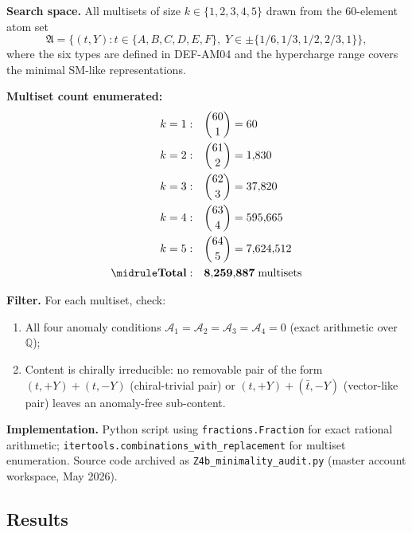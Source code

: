 \documentclass[12pt, a4paper]{article}
\begin{document}
\begin{formalbox}[title={Audit methodology (v17.5 master account)}]
\textbf{Search space.} All multisets of size $k \in \{1, 2, 3, 4, 5\}$
drawn from the 60-element atom set
\begin{equation*}
  \mathfrak{A} = \{(t, Y) : t \in \{A, B, C, D, E, F\},\;
  Y \in \pm\{1/6, 1/3, 1/2, 2/3, 1\}\},
\end{equation*}
where the six types are defined in DEF-AM04 and the hypercharge range
covers the minimal SM-like representations.

\textbf{Multiset count enumerated:}
\begin{align*}
  k = 1: \quad &\binom{60}{1} = 60 \\
  k = 2: \quad &\binom{61}{2} = 1{,}830 \\
  k = 3: \quad &\binom{62}{3} = 37{,}820 \\
  k = 4: \quad &\binom{63}{4} = 595{,}665 \\
  k = 5: \quad &\binom{64}{5} = 7{,}624{,}512 \\
  \midrule
  \mathbf{Total:} \quad &\mathbf{8{,}259{,}887}\;\text{multisets}
\end{align*}

\textbf{Filter.} For each multiset, check:
\begin{enumerate}[leftmargin=*, noitemsep]
  \item All four anomaly conditions $\mathcal{A}_1 = \mathcal{A}_2
    = \mathcal{A}_3 = \mathcal{A}_4 = 0$ (exact arithmetic over $\mathbb{Q}$);
  \item Content is chirally irreducible: no removable pair of the form
    $(t, +Y) + (t, -Y)$ (chiral-trivial pair) or $(t, +Y) + (\bar t, -Y)$
    (vector-like pair) leaves an anomaly-free sub-content.
\end{enumerate}

\textbf{Implementation.} Python script using \texttt{fractions.Fraction}
for exact rational arithmetic; \texttt{itertools.combinations\_with\_\allowbreak{}replacement}
for multiset enumeration. Source code archived as
\texttt{Z4b\_minimality\_audit.py} (master account workspace,
May 2026).
\end{formalbox}

\subsection{Results}
\end{document}
